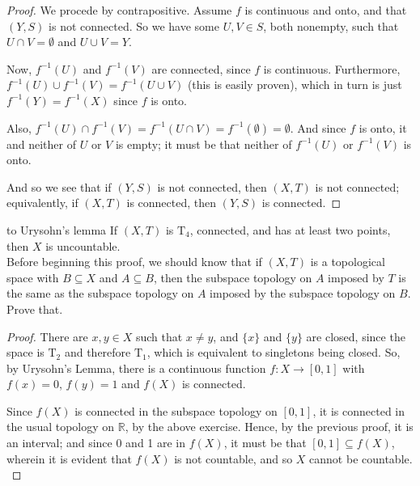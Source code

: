 \documentclass[12pt]{report}
\newcommand{\exercise}{ \noindent{\sc Exercise }\hspace{5pt} }
\newcommand{\corollary} {\noindent{\sc Corollary}\hspace{5pt} }
\newcommand{\reals}{\mathbb{R}}
\newcommand{\T}[1]{$\textrm{T}_#1$}
\begin{document}
\begin{proof}
We procede by contrapositive. Assume $f$ is continuous and onto, and that 
$(Y,S)$ is not connected. So we have some $U,V \in S$, both nonempty, such
that $U \cap V = \emptyset$ and $U \cup V = Y$. 

Now, $f^{-1}(U)$ and $f^{-1}(V)$ are connected, since $f$ is continuous. 
Furthermore, $f^{-1}(U) \cup f^{-1}(V) = f^{-1}(U \cup V)$ (this is easily
proven), which in turn is just $f^{-1}(Y) = f^{-1}(X)$ since $f$ is onto.

Also, $f^{-1}(U) \cap f^{-1}(V) = f^{-1}(U \cap V) = f^{-1}(\emptyset) =
\emptyset$. And since $f$ is onto, it and neither of $U$ or $V$ is empty; it
must be that neither of $f^{-1}(U)$ or $f^{-1}(V)$ is onto.

And so we see that if $(Y,S)$ is not connected, then $(X,T)$ is not connected;
equivalently, if $(X,T)$ is connected, then $(Y,S)$ is connected.

\end{proof}

\corollary {\sc to Urysohn's lemma}  If $(X,T)$ is \T{4}, connected, and has
at least two points, then $X$ is uncountable.\\

Before beginning this proof, we should know that if $(X,T)$ is a topological
space with $B \subseteq X$ and $A \subseteq B$, then the subspace topology on
$A$ imposed by $T$ is the same as the subspace topology on $A$ imposed by the
subspace topology on $B$.\\

\exercise Prove that.\\

\begin{proof}
There are $x,y \in X$ such that $x \neq y$, and $\{x\}$ and $\{y\}$ are
closed, since the space is \T{2} and therefore \T{1}, which is equivalent to
singletons being closed. So, by Urysohn's Lemma, there is a continuous
function $f:X \rightarrow [0,1]$ with $f(x) = 0$, $f(y) = 1$ and $f(X)$ is
connected. 

Since $f(X)$ is connected in the subspace topology on $[0,1]$, it
is connected in the usual topology on $\reals$, by the above exercise. Hence,
by the previous proof, it is an interval; and since 0 and 1 are in $f(X)$, it
must be that $[0,1] \subseteq f(X)$, wherein it is evident that $f(X)$ is not
countable, and so $X$ cannot be countable.\\
\end{proof}
\end{document}
